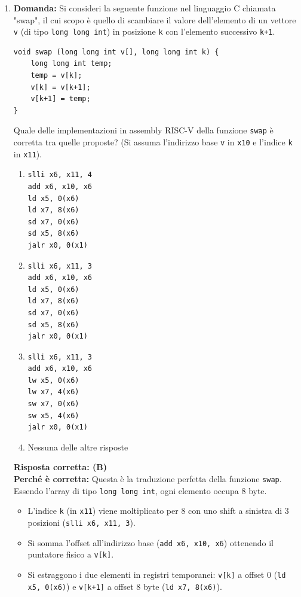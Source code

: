 \documentclass[12pt, a4paper]{article}
\begin{document}
\begin{enumerate}
    \item \textbf{Domanda:} Si consideri la seguente funzione nel linguaggio C chiamata "swap", il cui scopo è quello di scambiare il valore dell'elemento di un vettore \texttt{v} (di tipo \texttt{long long int}) in posizione \texttt{k} con l'elemento successivo \texttt{k+1}. 
\begin{verbatim}
void swap (long long int v[], long long int k) {
    long long int temp;
    temp = v[k];
    v[k] = v[k+1];
    v[k+1] = temp;
}
\end{verbatim}
    Quale delle implementazioni in assembly RISC-V della funzione \texttt{swap} è corretta tra quelle proposte? (Si assuma l'indirizzo base \texttt{v} in \texttt{x10} e l'indice \texttt{k} in \texttt{x11}).
    \begin{enumerate}[label=(\Alph*)]
        \item 
\begin{verbatim}
slli x6, x11, 4
add x6, x10, x6
ld x5, 0(x6)
ld x7, 8(x6)
sd x7, 0(x6)
sd x5, 8(x6)
jalr x0, 0(x1)
\end{verbatim}
        \item 
\begin{verbatim}
slli x6, x11, 3
add x6, x10, x6
ld x5, 0(x6)
ld x7, 8(x6)
sd x7, 0(x6)
sd x5, 8(x6)
jalr x0, 0(x1)
\end{verbatim}
        \item 
\begin{verbatim}
slli x6, x11, 3
add x6, x10, x6
lw x5, 0(x6)
lw x7, 4(x6)
sw x7, 0(x6)
sw x5, 4(x6)
jalr x0, 0(x1)
\end{verbatim}
        \item Nessuna delle altre risposte
    \end{enumerate}
    \textbf{Risposta corretta: (B)} \\
    \textbf{Perché è corretta:} Questa è la traduzione perfetta della funzione \texttt{swap}. Essendo l'array di tipo \texttt{long long int}, ogni elemento occupa 8 byte.
    \begin{itemize}
        \item L'indice \texttt{k} (in \texttt{x11}) viene moltiplicato per 8 con uno shift a sinistra di 3 posizioni (\texttt{slli x6, x11, 3}). 
        \item Si somma l'offset all'indirizzo base (\texttt{add x6, x10, x6}) ottenendo il puntatore fisico a \texttt{v[k]}.
        \item Si estraggono i due elementi in registri temporanei: \texttt{v[k]} a offset 0 (\texttt{ld x5, 0(x6)}) e \texttt{v[k+1]} a offset 8 byte (\texttt{ld x7, 8(x6)}).

\end{itemize}
\end{enumerate}
\end{document}

